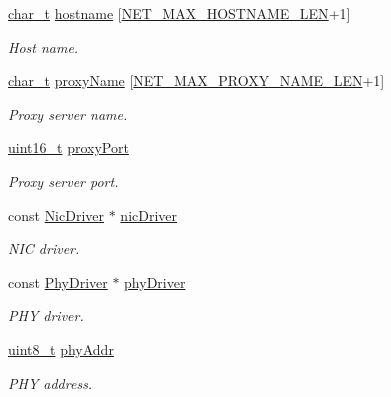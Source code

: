 \begin{DoxyCompactItemize}
\hyperlink{compiler__port_8h_a40bb5262bf908c328fbcfbe5d29d0201}{char\+\_\+t} \hyperlink{struct__NetInterface_aedfb2c021f93d86d510d000b0c230ead}{hostname} \mbox{[}\hyperlink{net_8h_a3f9223c8ef61451fec92d5354c93b34f}{N\+E\+T\+\_\+\+M\+A\+X\+\_\+\+H\+O\+S\+T\+N\+A\+M\+E\+\_\+\+L\+EN}+1\mbox{]}
\begin{DoxyCompactList}\small\item\em Host name. \end{DoxyCompactList}\item 
\hyperlink{compiler__port_8h_a40bb5262bf908c328fbcfbe5d29d0201}{char\+\_\+t} \hyperlink{struct__NetInterface_af649c84aaf6b8d98deaa98881da051a2}{proxy\+Name} \mbox{[}\hyperlink{net_8h_ab0499e73f3380a2848bbfcd69dc109da}{N\+E\+T\+\_\+\+M\+A\+X\+\_\+\+P\+R\+O\+X\+Y\+\_\+\+N\+A\+M\+E\+\_\+\+L\+EN}+1\mbox{]}
\begin{DoxyCompactList}\small\item\em Proxy server name. \end{DoxyCompactList}\item 
\hyperlink{stdint_8h_a273cf69d639a59973b6019625df33e30}{uint16\+\_\+t} \hyperlink{struct__NetInterface_a1670fe9d288cf4d11bfdf9e61e95752a}{proxy\+Port}
\begin{DoxyCompactList}\small\item\em Proxy server port. \end{DoxyCompactList}\item 
const \hyperlink{structNicDriver}{Nic\+Driver} $\ast$ \hyperlink{struct__NetInterface_ab9164c30bb4d952d2420681b967aa165}{nic\+Driver}
\begin{DoxyCompactList}\small\item\em N\+IC driver. \end{DoxyCompactList}\item 
const \hyperlink{structPhyDriver}{Phy\+Driver} $\ast$ \hyperlink{struct__NetInterface_a9f31014c24e11e57940f15a3a8a46006}{phy\+Driver}
\begin{DoxyCompactList}\small\item\em P\+HY driver. \end{DoxyCompactList}\item 
\hyperlink{stdint_8h_aba7bc1797add20fe3efdf37ced1182c5}{uint8\+\_\+t} \hyperlink{struct__NetInterface_aebf24765c4ba138f7b8fc34e5fad093f}{phy\+Addr}
\begin{DoxyCompactList}\small\item\em P\+HY address. \end{DoxyCompactList}\item 

\end{DoxyCompactItemize}
